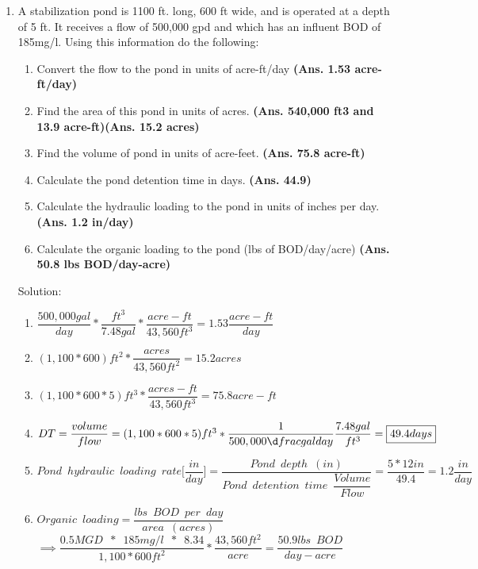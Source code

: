 \begin{enumerate}
\item A stabilization pond is 1100 ft. long, 600 ft wide, and is operated at a depth of 5 ft. It receives a flow of 500,000 gpd and which has an influent BOD of 185mg/l.  Using this information do the following:
\begin{enumerate}
\item Convert the flow to the pond in units of acre-ft/day \textbf{(Ans. 1.53 acre-ft/day)}
\item Find the area of this pond in units of acres. \textbf{(Ans. 540,000 ft3 and 13.9 acre-ft)}\textbf{(Ans. 15.2 acres)}
\item Find the volume of pond in units of acre-feet. \textbf{(Ans. 75.8 acre-ft)}
\item Calculate the pond detention time in days. \textbf{(Ans. 44.9)}
\item Calculate the hydraulic loading to the pond in units of inches per day. \textbf{(Ans. 1.2 in/day)}
\item Calculate the organic loading to the pond (lbs of BOD/day/acre) \textbf{(Ans. 50.8 lbs BOD/day-acre)}
\end{enumerate}


Solution:\\
\begin{enumerate}
\item $\dfrac{500,000gal}{day}*\dfrac{ft^3}{7.48gal}*\dfrac{acre-ft}{43,560ft^3}=\boxed{1.53\dfrac{acre-ft}{day}}$
\item $(1,100*600)ft^2*\dfrac{acres}{43,560 ft^2}=\boxed{15.2acres}$
\item $(1,100*600*5)ft^3*\dfrac{acres-ft}{43,560 ft^3}=\boxed{75.8 acre-ft}$
\item $DT=\dfrac{volume}{flow}=(1,100*600*5)ft^3*\dfrac{1}{500,000\d
frac{gal}{day}}\dfrac{7.48gal}{ft^3}=\boxed{49.4days}$
\item $Pond \enspace hydraulic \enspace loading \enspace rate \Bigg[\dfrac{in}{day}\Bigg]=\dfrac{Pond \enspace depth \enspace (in)}{Pond \enspace detention  \enspace time \enspace \dfrac{Volume}{Flow}}=\dfrac{5*12in}{49.4}=\boxed{1.2\dfrac{in}{day}}$ \\
\item $Organic \enspace loading=\dfrac{lbs \enspace BOD \enspace per \enspace day}{area \enspace (acres)}$\\
$\implies \dfrac{0.5MGD \enspace * \enspace 185mg/l \enspace * \enspace 8.34}{1,100*600ft^2}*\dfrac{43,560ft^2}{acre}=\boxed{\dfrac{50.9lbs \enspace BOD}{day-acre}}$
\end{enumerate}


\end{enumerate}
